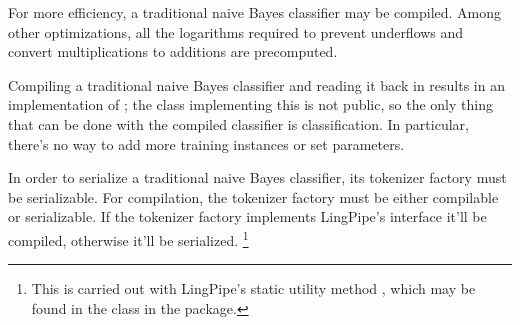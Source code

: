 For more efficiency, a traditional naive Bayes classifier may be
compiled.  Among other optimizations, all the logarithms required
to prevent underflows and convert multiplications to additions
are precomputed.  

Compiling a traditional naive Bayes classifier and reading it back in
results in an implementation of ;
the class implementing this is not public, so the only thing that can
be done with the compiled classifier is classification.  In particular,
there's no way to add more training instances or set parameters.

In order to serialize a traditional naive Bayes classifier, its
tokenizer factory must be serializable.  For compilation, the
tokenizer factory must be either compilable or serializable.  If
the tokenizer factory implements LingPipe's  interface
it'll be compiled, otherwise it'll be serialized.%
%
\footnote{This is carried out with LingPipe's static utility method
  , which may be found in the
   class in the 
  package.}

